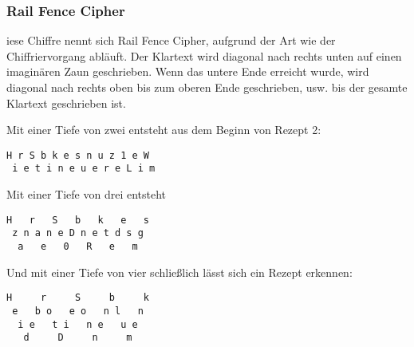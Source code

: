 \subsubsection{Rail Fence Cipher}

iese Chiffre nennt sich Rail Fence Cipher, aufgrund der Art wie der
Chiffriervorgang abläuft. Der Klartext wird diagonal nach rechts unten auf einen
imaginären Zaun geschrieben. Wenn das untere Ende erreicht wurde, wird diagonal
nach rechts oben bis zum oberen Ende geschrieben, usw. bis der gesamte Klartext
geschrieben ist.

Mit einer Tiefe von zwei entsteht aus dem Beginn von Rezept 2:

\begin{lstlisting}
H r S b k e s n u z 1 e W
 i e t i n e u e r e L i m
\end{lstlisting}

Mit einer Tiefe von drei entsteht

\begin{lstlisting}
H   r   S   b   k   e   s
 z n a n e D n e t d s g
  a   e   0   R   e   m
\end{lstlisting}
Und mit einer Tiefe von vier schließlich lässt sich ein Rezept erkennen:
\begin{lstlisting}
H     r     S     b     k
 e   b o   e o   n l   n
  i e   t i   n e   u e
   d     D     n     m
\end{lstlisting}



